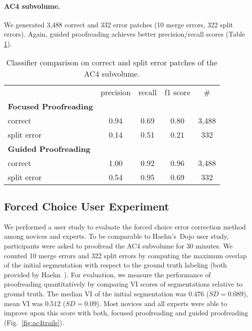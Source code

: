 \paragraph{AC4 subvolume.} We generated 3,488 correct and 332 error patches (10 merge errors, 322 split errors). Again, guided proofreading achieves better precision/recall scores (Table \ref{tab:prac4}).

\begin{table}[h]
\caption{Classifier comparison on correct and split error patches of the AC4 subvolume.}%

\small{
\begin{tabular}{l|c|c|c|c}

 & precision & recall & f1 score & \# \\ 
\textbf{Focused Proofreading} & ~ & ~ & ~ & ~ \\ 
correct & 0.94 & 0.69 & 0.80 & 3,488 \\ 
split error & 0.14 & 0.51 & 0.21 & 332 \\ 
\textbf{Guided Proofreading} & ~ & ~ & ~ & ~ \\ 
correct & 1.00 & 0.92 & 0.96 & 3,488 \\ 
split error & 0.54 & 0.95 & 0.69 & 332 \\ 
\end{tabular} 
}
\label{tab:prac4}
\end{table}

\subsection{Forced Choice User Experiment}
We performed a user study to evaluate the forced choice error correction method among novices and experts. To be comparable to Haehn's~\etal Dojo user study, participants were asked to proofread the AC4 subvolume for 30 minutes. We counted 10 merge errors and 322 split errors by computing the maximum overlap of the initial segmentation with respect to the ground truth labeling (both provided by Haehn~\etal). For evaluation, we measure the performance of proofreading quantitatively by comparing VI scores of segmentations relative to ground truth. The median VI of the initial segmentation was $0.476$ ($SD=0.089$), mean VI was $0.512$ ($SD=0.09$). Most novices and all experts were able to improve upon this score with both, focused proofreading and guided proofreading (Fig.~\ref{fig:ac4trails}).

